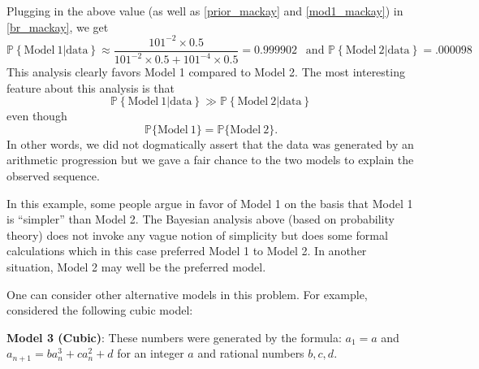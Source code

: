 \documentclass{scrartcl}
\renewcommand{\P}{{\mathbb P}}
\begin{document}
Plugging in the above value (as well as \eqref{prior_mackay} and
\eqref{mod1_mackay}) in \eqref{br_mackay}, we get
\begin{equation*}
    \P \left\{\text{Model}~ 1 | \text{data}  \right\} \approx
   \frac{101^{-2} \times 0.5}{101^{-2} \times 0.5 + 101^{-4} \times
     0.5} = 0.999902 ~~ \text{ and }     \P \left\{\text{Model}~ 2 |
     \text{data}  \right\} = .000098
 \end{equation*}
 This analysis clearly favors Model 1 compared to Model 2. The most
 interesting feature about this analysis is that
 \begin{equation*}
   \P \left\{\text{Model}~ 1 | \text{data}  \right\} \gg \P \left\{\text{Model}~ 2 | \text{data}  \right\}
 \end{equation*}
 even though
 \begin{equation*}
   \P \{\text{Model}~1\} = \P \{\text{Model}~2\}. 
 \end{equation*}
In other words, we did not dogmatically assert that the data was
generated by an arithmetic progression but we gave a fair chance to
the two models to explain the observed sequence.

In this example, some people argue in favor of Model 1 on the basis
that Model 1 is ``simpler'' than Model 2. The Bayesian analysis above (based on
probability theory) does not
invoke any vague notion of simplicity but does some formal
calculations which in this case preferred Model 1 to Model 2. In
another situation, Model 2 may well be the preferred model.

One can consider other alternative models in this problem. For
example, \citet[Chapter 28]{MacKay} considered the following cubic
model:  

\textbf{Model 3 (Cubic)}: These numbers were generated by the
     formula: $a_1 = a$ and $a_{n+1} = b a_n^3 + c a_n^2 + d$ for an
     integer $a$ and rational numbers $b, c, d$.
\end{document}
